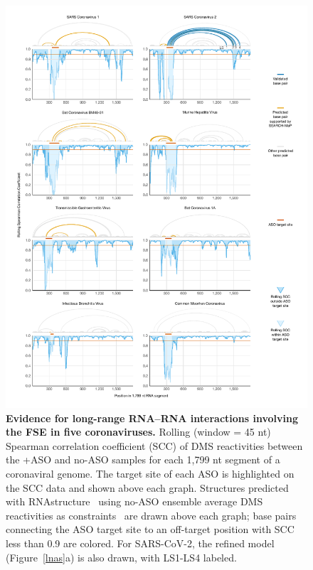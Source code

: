 \documentclass[main.tex]{subfiles}
\begin{document}
\begin{figure}[H]
	\includegraphics[width=\textwidth]{../MainFigures/covs/covs.pdf}
	\caption{\textbf{Evidence for long-range RNA--RNA interactions involving the FSE in five coronaviruses.} Rolling (window = 45 nt) Spearman correlation coefficient (SCC) of DMS reactivities between the +ASO and no-ASO samples for each 1,799 nt segment of a coronaviral genome. The target site of each ASO is highlighted on the SCC data and shown above each graph. Structures predicted with RNAstructure~\cite{Mathews2004} using no-ASO ensemble average DMS reactivities as constraints~\cite{Cordero2012} are drawn above each graph; base pairs connecting the ASO target site to an off-target position with SCC less than 0.9 are colored. For SARS-CoV-2, the refined model (Figure~\ref{lnas}a) is also drawn, with LS1-LS4 labeled.}
	\label{covs}
\end{figure}
\end{document}
